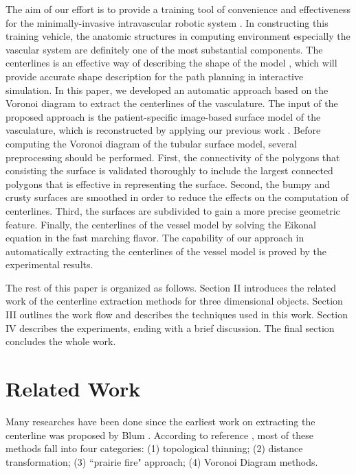 The aim of our effort is to provide a training tool of convenience and effectiveness for the minimally-invasive intravascular robotic system \cite{Ji2011EMBC}.
In constructing this training vehicle, the anatomic structures in computing environment especially the vascular system are definitely one of the most substantial components.
The centerlines is an effective way of describing the shape of the model \cite{Ogniewicz1995}, which will provide accurate shape description for the path planning in interactive simulation.
In this paper, we developed an automatic approach based on the Voronoi diagram \cite{Antiga2003} to extract the centerlines of the vasculature.
The input of the proposed approach is the patient-specific image-based surface model of the vasculature, which is reconstructed by applying our previous work \cite{Yang2014ICRA}. %
Before computing the Voronoi diagram of the tubular surface model, several preprocessing should be performed.
First, the connectivity of the polygons that consisting the surface is validated thoroughly to include the largest connected polygons that is effective in representing the surface. %
Second, the bumpy and crusty surfaces are smoothed in order to reduce the effects on the computation of centerlines.
Third, the surfaces are subdivided to gain a more precise geometric feature.
Finally, the centerlines of the vessel model by solving the Eikonal equation in the fast marching flavor.
The capability of our approach in automatically extracting the centerlines of the vessel model is proved by the experimental results.

The rest of this paper is organized as follows.
Section II introduces the related work of the centerline extraction methods for three dimensional objects.
Section III outlines the work flow and describes the techniques used in this work.
Section IV describes the experiments, ending with a brief discussion.
The final section concludes the whole work.

\section{Related Work}

Many researches have been done since the earliest work on extracting the centerline was proposed by Blum \cite{Blum1967}.
According to reference \cite{Ogniewicz1995}, most of these methods fall into four categories: (1) topological thinning; (2) distance transformation; (3) ``prairie fire" approach; (4) Voronoi Diagram methods. %

